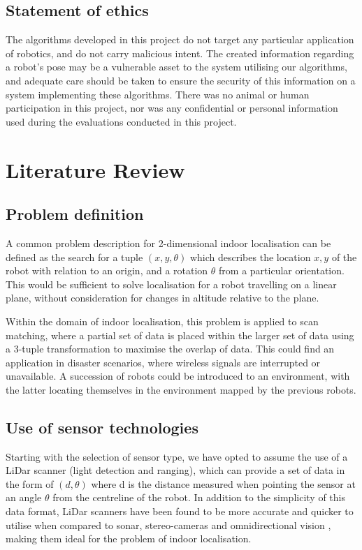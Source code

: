 \documentclass[authoryearcitations]{UoYCSproject}
\begin{document}
\section{Statement of ethics}
The algorithms developed in this project do not target any particular application of robotics, and do not carry malicious intent. The created information regarding a robot's pose may be a vulnerable asset to the system utilising our algorithms, and adequate care should be taken to ensure the security of this information on a system implementing these algorithms. There was no animal or human participation in this project, nor was any confidential or personal information used during the evaluations conducted in this project.

\chapter{Literature Review}
\label{cha:lit_review}

\section{Problem definition}
A common problem description for 2-dimensional indoor localisation can be defined as the search for a tuple $(x, y, \theta)$ which describes the location $x, y$ of the robot with relation to an origin, and a rotation $\theta$ from a particular orientation. This would be sufficient to solve localisation for a robot travelling on a linear plane, without consideration for changes in altitude relative to the plane. \newline

Within the domain of indoor localisation, this problem is applied to scan matching, where a partial set of data is placed within the larger set of data using a 3-tuple transformation to maximise the overlap of data. This could find an application in disaster scenarios, where wireless signals are interrupted or unavailable. A succession of robots could be introduced to an environment, with the latter locating themselves in the environment mapped by the previous robots.

\section{Use of sensor technologies}
Starting with the selection of sensor type, we have opted to assume the use of a LiDar scanner (light detection and ranging), which can provide a set of data in the form of $(d, \theta)$ where d is the distance measured when pointing the sensor at an angle $\theta$ from the centreline of the robot. In addition to the simplicity of this data format, LiDar scanners have been found to be more accurate and quicker to utilise when compared to sonar, stereo-cameras and omnidirectional vision \cite{Lingemann2005-hm}, making them ideal for the problem of indoor localisation. 
\end{document}
